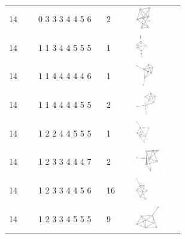 \begin{table}[h!]
\begin{tabular}{m{0.15\linewidth} m{0.35\linewidth} m{0.15\linewidth} m{0.25\linewidth}}
14 & 0 3 3 3 4 4 5 6 & 2 & \includegraphics[height=1cm]{15-universal-graphs/img/degree-sequences-example-graphs/graph-4-8-63}\\
14 & 1 1 3 4 4 5 5 5 & 1 & \includegraphics[height=1cm]{15-universal-graphs/img/degree-sequences-example-graphs/graph-4-8-64}\\
14 & 1 1 4 4 4 4 4 6 & 1 & \includegraphics[height=1cm]{15-universal-graphs/img/degree-sequences-example-graphs/graph-4-8-65}\\
14 & 1 1 4 4 4 4 5 5 & 2 & \includegraphics[height=1cm]{15-universal-graphs/img/degree-sequences-example-graphs/graph-4-8-66}\\
14 & 1 2 2 4 4 5 5 5 & 1 & \includegraphics[height=1cm]{15-universal-graphs/img/degree-sequences-example-graphs/graph-4-8-67}\\
14 & 1 2 3 3 4 4 4 7 & 2 & \includegraphics[height=1cm]{15-universal-graphs/img/degree-sequences-example-graphs/graph-4-8-68}\\
14 & 1 2 3 3 4 4 5 6 & 16 & \includegraphics[height=1cm]{15-universal-graphs/img/degree-sequences-example-graphs/graph-4-8-69}\\
14 & 1 2 3 3 4 5 5 5 & 9 & \includegraphics[height=1cm]{15-universal-graphs/img/degree-sequences-example-graphs/graph-4-8-70}\\

\end{tabular}
\end{table}
